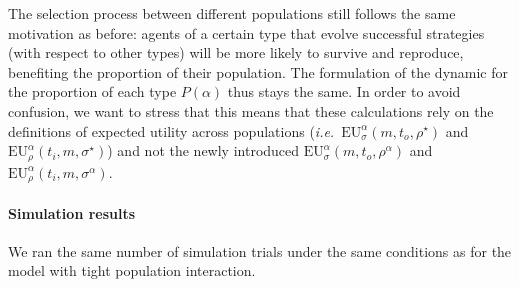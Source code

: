 \documentclass[a4paper]{article}
\begin{document}
The selection process between different populations still follows the same motivation as before: agents of a certain type that evolve successful strategies (with respect to other types) will be more likely to survive and reproduce, benefiting the proportion of their population.
The formulation of the dynamic for the proportion of each type $P(\alpha)$ thus stays the same.
In order to avoid confusion, we want to stress that this means that these calculations rely on the definitions of expected utility across populations (\emph{i.e.}~$\text{EU}_{\sigma}^{\alpha}(m,t_{o},\rho^{\star})$ and $\text{EU}_{\rho}^{\alpha}(t_{i},m,\sigma^{\star})$) and not the newly introduced $\text{EU}_{\sigma}^{\alpha}(m,t_{o},\rho^{\alpha})$ and $\text{EU}_{\rho}^{\alpha}(t_{i},m,\sigma^{\alpha})$.

\paragraph{Simulation results}
We ran the same number of simulation trials under the same conditions as for the model with tight population interaction.
\end{document}
